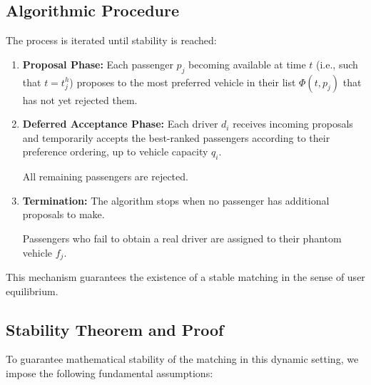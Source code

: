 \documentclass[11pt,a4paper]{article}
\begin{document}
\subsection{Algorithmic Procedure}

The process is iterated until stability is reached:

\begin{enumerate}

    \item \textbf{Proposal Phase:}
    Each passenger $p_j$ becoming available at time $t$ (i.e., such that $t=t_j^h$) proposes to the most preferred vehicle in their list $\Phi(t,p_j)$ that has not yet rejected them.

    \item \textbf{Deferred Acceptance Phase:}
    Each driver $d_i$ receives incoming proposals and temporarily accepts the best-ranked passengers according to their preference ordering, up to vehicle capacity $q_i$.

    All remaining passengers are rejected.

    \item \textbf{Termination:}
    The algorithm stops when no passenger has additional proposals to make.

    Passengers who fail to obtain a real driver are assigned to their phantom vehicle $f_j$.

\end{enumerate}

This mechanism guarantees the existence of a stable matching in the sense of user equilibrium.

\subsection{Stability Theorem and Proof}

To guarantee mathematical stability of the matching in this dynamic setting, we impose the following fundamental assumptions:
\end{document}
